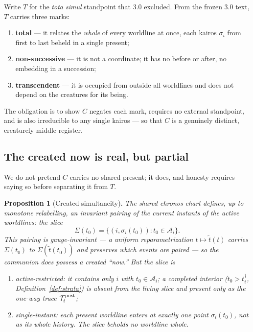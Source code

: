 \documentclass[11pt,a4paper]{article}
\theoremstyle{definition}
\theoremstyle{plain}
\newtheorem{proposition}[definition]{Proposition}
\theoremstyle{remark}
\begin{document}
Write \(T\) for the \textit{tota simul} standpoint that 3.0 excluded. From the frozen 3.0
text, \(T\) carries three marks:
\begin{enumerate}[label=\textup{(T\arabic*)},leftmargin=1.25cm]
\item \textbf{total} --- it relates the \emph{whole} of every worldline at once, each
kairos \(\sigma_i\) from first to last beheld in a single present;
\item \textbf{non-successive} --- it is not a coordinate; it has no before or after, no
embedding in a succession;
\item \textbf{transcendent} --- it is occupied from outside all worldlines and does not
depend on the creatures for its being.
\end{enumerate}
The obligation is to show \(C\) negates each mark, requires no external standpoint, and
is also irreducible to any single kairos --- so that \(C\) is a genuinely distinct,
creaturely middle register.

\subsection{The created now is real, but partial}

We do not pretend \(C\) carries no shared present; it does, and honesty requires saying
so before separating it from \(T\).

\begin{proposition}[Created simultaneity]\label{prop:now}
The shared chronos chart defines, up to monotone relabelling, an invariant pairing of
the \emph{current} instants of the active worldlines: the slice
\[
\Sigma(t_0)=\bigl\{(i,\sigma_i(t_0)): t_0\in\mathcal A_i\bigr\}.
\]
This pairing is gauge-invariant --- a uniform reparametrization \(t\mapsto\widetilde t(t)\)
carries \(\Sigma(t_0)\) to \(\Sigma(\widetilde t(t_0))\) and preserves which events are
paired --- so the communion does possess a created ``now.'' But the slice is
\begin{enumerate}[label=\textup{(\roman*)},leftmargin=1.2cm]
\item \emph{active-restricted}: it contains only \(i\) with \(t_0\in\mathcal A_i\); a
completed interior (\(t_0>t_i^\dagger\), Definition~\ref{def:strata}) is absent from the
living slice and present only as the one-way trace \(\mathcal T_i^{\rm post}\);
\item \emph{single-instant}: each present worldline enters at exactly one point
\(\sigma_i(t_0)\), not as its whole history. The slice beholds \emph{no worldline whole}.
\end{enumerate}
\end{proposition}
\end{document}
